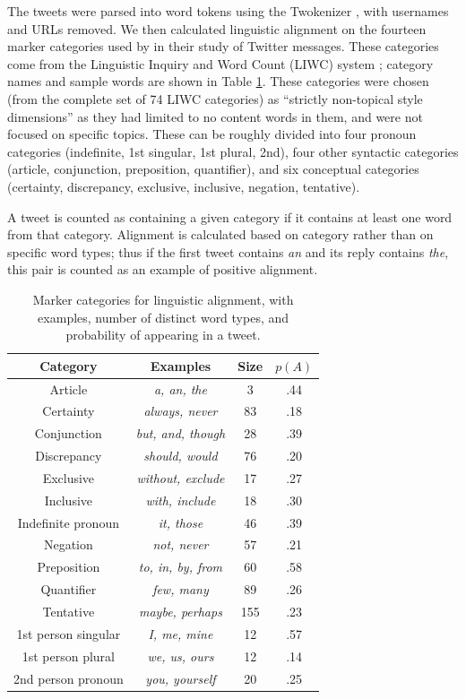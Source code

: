 \documentclass{acm_proc_article-sp}
\begin{document}
The tweets were parsed into word tokens using the Twokenizer \cite{OwoputiEtAl2013}, with usernames and URLs removed.  We then calculated linguistic alignment on the fourteen marker categories used by \cite{DNMGamonDumais2011} in their study of Twitter messages.  These categories come from the Linguistic Inquiry and Word Count (LIWC) system \cite{LIWC}; category names and sample words are shown in Table \ref{tab:LIWC}. These categories were chosen (from the complete set of 74 LIWC categories) as ``strictly non-topical style dimensions'' as they had limited to no content words in them, and were not focused on specific topics.  These can be roughly divided into four pronoun categories (indefinite, 1st singular, 1st plural, 2nd), four other syntactic categories (article, conjunction, preposition, quantifier), and six conceptual categories (certainty, discrepancy, exclusive, inclusive, negation, tentative).

A tweet is counted as containing a given category if it contains at least one word from that category.  Alignment is calculated based on category rather than on specific word types; thus if the first tweet contains \textit{an} and its reply contains \textit{the}, this pair is counted as an example of positive alignment.

\begin{table}
\centering
\caption{Marker categories for linguistic alignment, with examples, number of distinct word types, and probability of appearing in a tweet.}\label{tab:LIWC}
\begin{tabular}{|c|c|c|c|} \hline
Category & Examples & Size & $p(A)$\\ \hline
Article & \textit{a, an, the} & 3 & .44 \\
Certainty  & \textit{always, never} & 83 & .18 \\
Conjunction  & \textit{but, and, though} & 28 & .39\\
Discrepancy  & \textit{should, would} & 76 & .20 \\
Exclusive  & \textit{without, exclude} & 17 & .27\\
Inclusive  & \textit{with, include} & 18 & .30\\
Indefinite pronoun  & \textit{it, those} & 46 & .39\\
Negation  & \textit{not, never} & 57 & .21\\
Preposition  & \textit{to, in, by, from} & 60 & .58\\
Quantifier  & \textit{few, many} & 89 & .26\\
Tentative & \textit{maybe, perhaps} & 155 & .23\\
1st person singular  & \textit{I, me, mine} & 12 & .57\\
1st person plural & \textit{we, us, ours} & 12 & .14\\
2nd person pronoun   & \textit{you, yourself} & 20 & .25\\
\hline\end{tabular}
\end{table}
\end{document}
